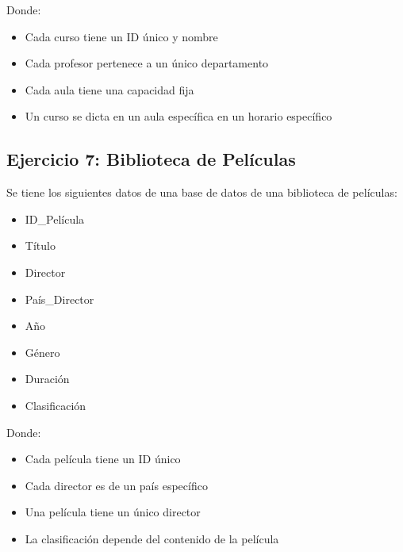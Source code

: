 \documentclass[12pt]{article}
\begin{document}
\vspace{1em}

Donde:
\begin{itemize}
    \item Cada curso tiene un ID único y nombre
    \item Cada profesor pertenece a un único departamento
    \item Cada aula tiene una capacidad fija
    \item Un curso se dicta en un aula específica en un horario específico
\end{itemize}

\subsection{Ejercicio 7: Biblioteca de Películas}
Se tiene los siguientes datos de una base de datos de una biblioteca de películas:

\vspace{0.5em}

\begin{minipage}[t]{0.48\textwidth}
\begin{itemize}
    \item ID\_Película
    \item Título
    \item Director
    \item País\_Director
\end{itemize}
\end{minipage}
\hfill
\begin{minipage}[t]{0.48\textwidth}
\begin{itemize}
    \item Año
    \item Género
    \item Duración
    \item Clasificación
\end{itemize}
\end{minipage}

\vspace{1em}

Donde:
\begin{itemize}
    \item Cada película tiene un ID único
    \item Cada director es de un país específico
    \item Una película tiene un único director
    \item La clasificación depende del contenido de la película
\end{itemize}
\end{document}
